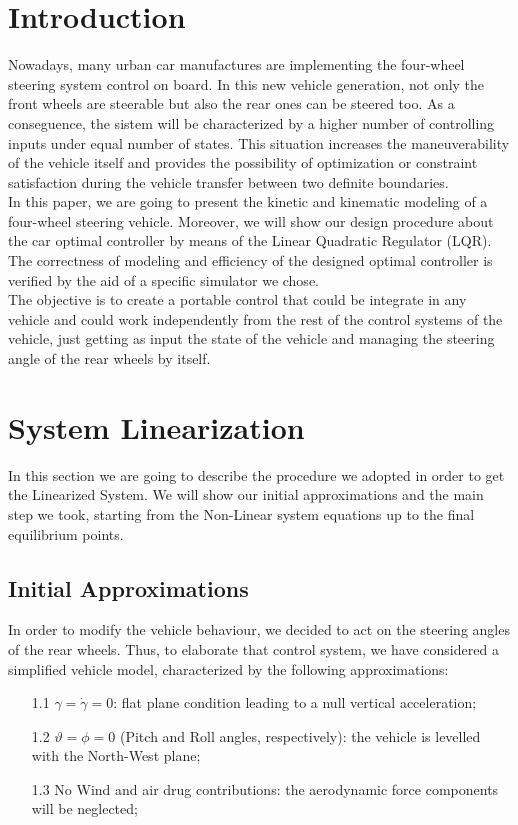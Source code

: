 \documentclass[a4paper,12pt,titlepage]{report}
\begin{document}
	\tableofcontents
\chapter{Introduction}
	Nowadays, many urban car manufactures are implementing the four-wheel steering system control on board. In this new vehicle generation, not only the front wheels are steerable but also the rear ones can be steered too. As a conseguence, the sistem will be characterized by a higher number of controlling inputs under equal number of states. This situation increases the maneuverability of the vehicle itself and provides the possibility of optimization or constraint satisfaction during the vehicle transfer between two definite boundaries.\\
	In this paper, we are going to present the kinetic and kinematic modeling of a four-wheel steering vehicle. Moreover, we will show our design procedure about the car optimal controller by means of the Linear Quadratic Regulator (LQR). The correctness of modeling and efficiency of the designed optimal controller is verified by the aid of a specific simulator we chose.\\
	The objective is to create a portable control that could be integrate in any vehicle and could work independently from the rest of the control systems of the vehicle, just getting as input the state of the vehicle and managing the steering angle of the rear wheels by itself.
\chapter{System Linearization}
	In this section we are going to describe the procedure we adopted in order to get the Linearized System. We will show our initial approximations and the main step we took, starting from the Non-Linear system equations up to the final equilibrium points. 
\section{Initial Approximations} \label{approx}	
	In order to modify the vehicle behaviour, we decided to act on the steering angles of the rear wheels. Thus, to elaborate that control system, we have considered a simplified vehicle model, characterized by the following approximations:
		\begin{itemize}
			\item[1.1] $ \gamma=\dot{\gamma}=0 $: flat plane condition leading to a null vertical acceleration;
			\item[1.2] $\vartheta = \phi = 0$ (Pitch and Roll angles, respectively): the vehicle is levelled with the North-West plane; 
			\item[1.3] No Wind and air drug contributions: the aerodynamic force components will be neglected;
		\end{itemize} 
\end{document}
